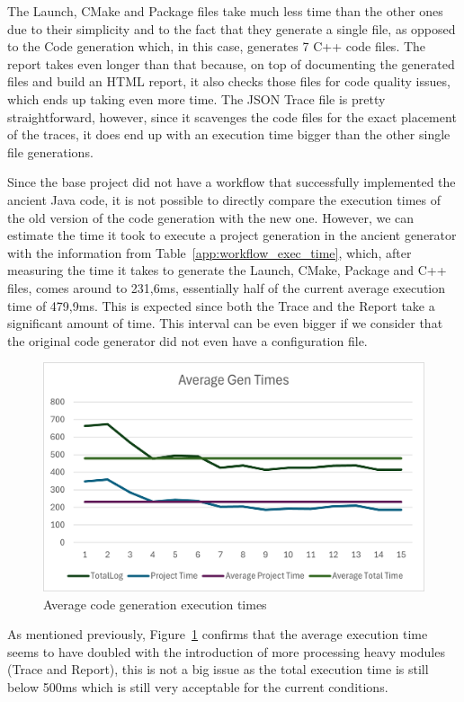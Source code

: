 The Launch, CMake and Package files take much less time than the other ones due to their simplicity and to the fact that they generate a single file, as opposed to the Code generation which, in this case, generates 7 C++ code files. The report takes even longer than that because, on top of documenting the generated files and build an HTML report, it also checks those files for code quality issues, which ends up taking even more time. The JSON Trace file is pretty straightforward, however, since it scavenges the code files for the exact placement of the traces, it does end up with an execution time bigger than the other single file generations.

Since the base project did not have a workflow that successfully implemented the ancient Java code, it is not possible to directly compare the execution times of the old version of the code generation with the new one. However, we can estimate the time it took to execute a project generation in the ancient generator with the information from Table~\ref{app:workflow_exec_time}, which, after measuring the time it takes to generate the Launch, CMake, Package and C++ files, comes around to 231,6ms, essentially half of the current average execution time of 479,9ms. This is expected since both the Trace and the Report take a significant amount of time. This interval can be even bigger if we consider that the original code generator did not even have a configuration file.

\begin{figure}[htbp]
	\centering
	\includegraphics[width=\textwidth]{avg_exec_times_1.png}
	\caption{Average code generation execution times}
	\label{fig:avg_exec_times_1}
\end{figure}

As mentioned previously, Figure~\ref{fig:avg_exec_times_1} confirms that the average execution time seems to have doubled with the introduction of more processing heavy modules (Trace and Report), this is not a big issue as the total execution time is still below 500ms which is still very acceptable for the current conditions.




